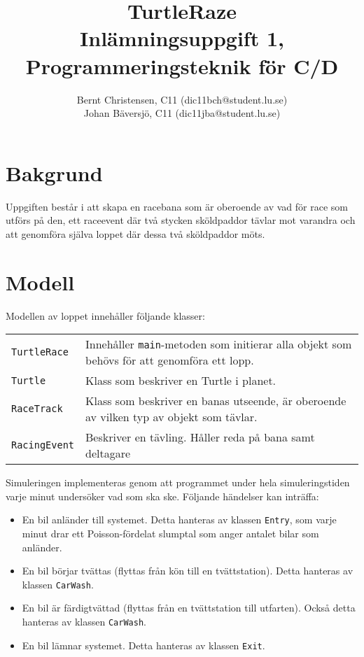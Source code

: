 \documentclass[a4paper]{article}
\title{TurtleRaze \\
	Inlämningsuppgift 1, Programmeringsteknik för C/D}
\author{Bernt Christensen, C11 (dic11bch@student.lu.se)\\
Johan Bäversjö, C11 (dic11jba@student.lu.se)}
\newcommand{\code}[1]{\texttt{#1}} %
\begin{document}

\maketitle                    %
\section{Bakgrund}
Uppgiften består i att skapa en racebana som är oberoende av vad för race som utförs på den, ett raceevent där två stycken sköldpaddor tävlar mot varandra och att genomföra själva loppet där dessa två sköldpaddor möts.

\section{Modell}
Modellen av loppet innehåller följande klasser:

\begin{tabular}{lp{8cm}}
\code{TurtleRace} & Innehåller \code{main}-metoden som initierar alla objekt som behövs för att genomföra ett lopp. \\
\code{Turtle} & Klass som beskriver en Turtle i planet. \\
\code{RaceTrack} & Klass som beskriver en banas utseende, är oberoende av vilken typ av objekt som tävlar. \\
\code{RacingEvent} & Beskriver en tävling. Håller reda på bana samt deltagare \\

\end{tabular}

\vspace{\baselineskip}
Simuleringen implementeras genom att programmet under hela simuleringstiden varje minut undersöker vad som ska ske. Följande händelser kan inträffa:

\begin{itemize}
\item En bil anländer till systemet. Detta hanteras av klassen \code{Entry}, som varje minut drar ett Poisson-fördelat slumptal som anger antalet bilar som anländer.
\item En bil börjar tvättas (flyttas från kön till en tvättstation). Detta hanteras av klassen \code{CarWash}.
\item En bil är färdigtvättad (flyttas från en tvättstation till utfarten). Också detta hanteras av klassen \code{CarWash}.
\item En bil lämnar systemet. Detta hanteras av klassen \code{Exit}.
\end{itemize}
\end{document}
